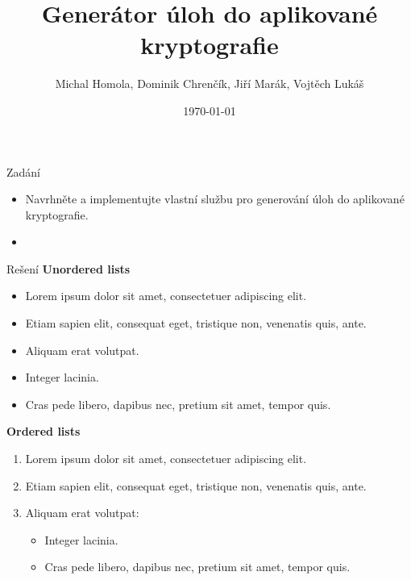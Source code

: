 \documentclass[aspectratio=1610]{beamer}
\title[Generátor úloh do aplikované kryptografie]
{Generátor úloh do aplikované kryptografie}
\author[ Homola, Chrenčík, Marák, Lukáš]
{Michal Homola, Dominik Chrenčík, Jiří Marák, Vojtěch Lukáš}
\institute
{MPC-KRY \\
Ústav telekomunikací  \\
VUT v Brně
}
\date{\today}
\begin{document}

\begin{frame}
    \titlepage
\end{frame}


\begin{frame}{Zadání}
    \begin{itemize}
        \item Navrhněte a implementujte vlastní službu pro generování úloh do aplikované
kryptografie.
        \item 
    
    \end{itemize}
\end{frame}

\begin{frame}{Rešení}
    \textbf{Unordered lists}
    \begin{itemize}
        \item Lorem ipsum dolor sit amet, consectetuer adipiscing elit.
        \item Etiam sapien elit, consequat eget, tristique non, venenatis quis, ante.
        \item Aliquam erat volutpat.
        \item Integer lacinia.
        \item Cras pede libero, dapibus nec, pretium sit amet, tempor quis.
    \end{itemize}
    \bigskip %

    \textbf{Ordered lists}
    \begin{enumerate}
        \item \alert{Lorem ipsum dolor} sit amet, consectetuer adipiscing elit.
        \item Etiam sapien elit, consequat eget, tristique non, venenatis quis, ante.
        \item Aliquam erat volutpat:
        \begin{itemize}
            \item Integer lacinia.
            \item Cras pede libero, dapibus nec, pretium sit amet, tempor quis.
        \end{itemize}
    \end{enumerate}
\end{frame}
\end{document}
